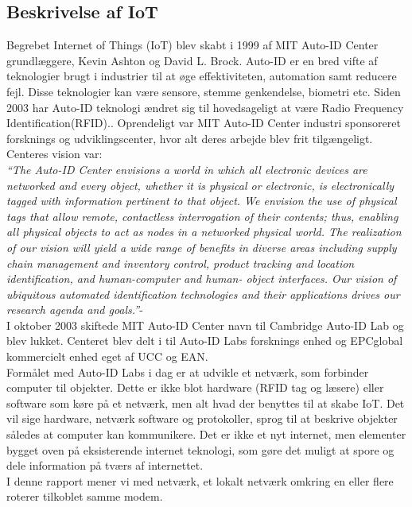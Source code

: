         \subsection{Beskrivelse af IoT}
        
        Begrebet Internet of Things (IoT) blev skabt i 1999 af MIT Auto-ID Center grundlæggere, Kevin Ashton og David L. Brock.\autocite{Hashmi2017} Auto-ID er en bred vifte af teknologier brugt i industrier til at øge effektiviteten, automation samt reducere fejl. Disse teknologier kan være sensore, stemme genkendelse, biometri etc. 
        Siden 2003 har Auto-ID teknologi ændret sig til hovedsageligt at være Radio Frequency Identification(RFID).\autocite{Sundmaeker2010}. Oprendeligt var MIT Auto-ID Center industri sponsoreret forsknings og udviklingscenter, hvor alt deres arbejde blev frit tilgængeligt. Centeres vision var:\\
        \textit{``The Auto-ID Center envisions a world in which all electronic devices are networked and every object, whether it is physical or electronic, is electronically tagged with information pertinent to that object.  We envision the use of physical tags that allow remote, contactless interrogation of their contents; thus, enabling all physical objects to act as nodes in a networked physical world. The realization of our vision will yield a wide range of benefits in diverse areas including supply chain management and inventory control, product tracking and location identification, and human-computer and human- object interfaces. Our vision of ubiquitous automated identification technologies and their applications drives our research agenda and goals.''}- \autocite[Kapitel 2,p. ~4]{Sarma2001} \\
        I oktober 2003 skiftede MIT Auto-ID Center navn til Cambridge Auto-ID Lab og blev lukket. Centeret blev delt i til Auto-ID Labs forsknings enhed og EPCglobal kommercielt enhed eget af UCC og EAN.\autocite{Sundmaeker2010}
        \\Formålet med Auto-ID Labs i dag er at udvikle et netværk, som forbinder computer til objekter. Dette er ikke blot hardware (RFID tag og læsere)
        eller software som køre på et netværk, men alt hvad der benyttes til at skabe IoT. Det vil sige hardware, netværk software og protokoller, sprog til at beskrive objekter således at computer kan kommunikere. Det er ikke et nyt internet, men elementer bygget oven på eksisterende internet teknologi, som gøre det muligt at spore og dele information på tværs af internettet.\autocite{Sundmaeker2010} \\
        I denne rapport mener vi med netværk, et lokalt netværk omkring en eller flere roterer tilkoblet samme modem. 
        \\
  
